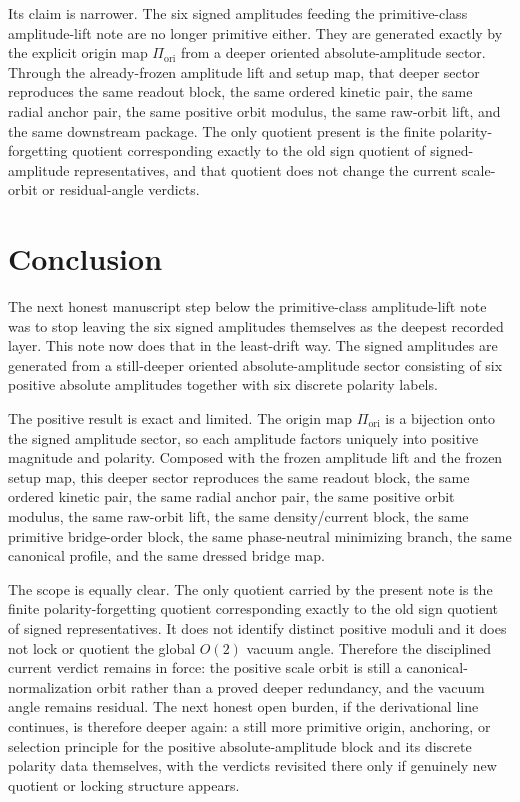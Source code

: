 \documentclass[11pt]{article}
\newcommand{\OriginMap}{\Pi_{\mathrm{ori}}}
\begin{document}
Its claim is narrower. The six signed amplitudes feeding the primitive-class amplitude-lift note are no longer primitive either. They are generated exactly by the explicit origin map \(\OriginMap\) from a deeper oriented absolute-amplitude sector. Through the already-frozen amplitude lift and setup map, that deeper sector reproduces the same readout block, the same ordered kinetic pair, the same radial anchor pair, the same positive orbit modulus, the same raw-orbit lift, and the same downstream package. The only quotient present is the finite polarity-forgetting quotient corresponding exactly to the old sign quotient of signed-amplitude representatives, and that quotient does not change the current scale-orbit or residual-angle verdicts.

\section{Conclusion}

The next honest manuscript step below the primitive-class amplitude-lift note was to stop leaving the six signed amplitudes themselves as the deepest recorded layer. This note now does that in the least-drift way. The signed amplitudes are generated from a still-deeper oriented absolute-amplitude sector consisting of six positive absolute amplitudes together with six discrete polarity labels.

The positive result is exact and limited. The origin map \(\OriginMap\) is a bijection onto the signed amplitude sector, so each amplitude factors uniquely into positive magnitude and polarity. Composed with the frozen amplitude lift and the frozen setup map, this deeper sector reproduces the same readout block, the same ordered kinetic pair, the same radial anchor pair, the same positive orbit modulus, the same raw-orbit lift, the same density/current block, the same primitive bridge-order block, the same phase-neutral minimizing branch, the same canonical profile, and the same dressed bridge map.

The scope is equally clear. The only quotient carried by the present note is the finite polarity-forgetting quotient corresponding exactly to the old sign quotient of signed representatives. It does not identify distinct positive moduli and it does not lock or quotient the global \(O(2)\) vacuum angle. Therefore the disciplined current verdict remains in force: the positive scale orbit is still a canonical-normalization orbit rather than a proved deeper redundancy, and the vacuum angle remains residual. The next honest open burden, if the derivational line continues, is therefore deeper again: a still more primitive origin, anchoring, or selection principle for the positive absolute-amplitude block and its discrete polarity data themselves, with the verdicts revisited there only if genuinely new quotient or locking structure appears.
\end{document}
